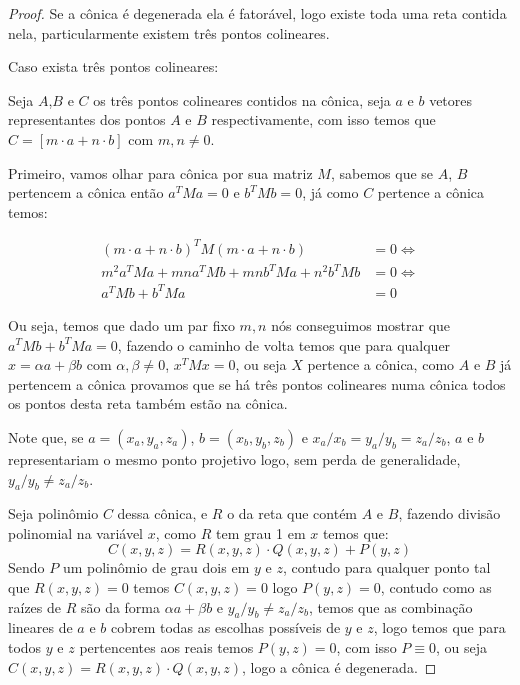 \begin{proof}
Se a cônica é degenerada ela é fatorável, logo existe toda uma reta contida nela, particularmente existem três pontos colineares.

Caso exista três pontos colineares:

Seja $A$,$B$ e $C$ os três pontos colineares contidos na cônica, seja $a$ e $b$ vetores representantes dos pontos $A$ e $B$ respectivamente, com isso temos que $C = [m\cdot a + n \cdot b]$ com $ m,n \ne 0$.

Primeiro, vamos olhar para cônica por sua matriz $M$, sabemos que se $A$, $B$ pertencem a cônica então \(a^T M a = 0 \text{ e } b^T M b = 0\), já como $C$ pertence a cônica temos:

\begin{align}
    (m\cdot a + n \cdot b)^T M (m\cdot a + n \cdot b) &= 0 \iff\\
    m^2 a^T M a + mn a^T M b + mn b^T M a + n^2 b^T M b &= 0 \iff \\
    a^T M b + b^T M a &= 0
\end{align}

Ou seja, temos que dado um par fixo $m,n$ nós conseguimos mostrar que $ a^T M b + b^T M a = 0$, fazendo o caminho de volta temos que para qualquer $x = \alpha a + \beta b$ com $\alpha,\beta \ne 0$, $x^T M x = 0$, ou seja $X$ pertence a cônica, como $A$ e $B$ já pertencem a cônica provamos que se há três pontos colineares numa cônica todos os pontos desta reta também estão na cônica.

Note que, se $a = (x_a,y_a,z_a)$, $b = (x_b,y_b,z_b)$ e $x_a/x_b = y_a/y_b = z_a/z_b$, $a$ e $b$ representariam o mesmo ponto projetivo logo, sem perda de generalidade, $y_a/y_b \ne z_a/z_b$.

Seja polinômio $C$ dessa cônica, e $R$ o da reta que contém $A$ e $B$, fazendo divisão polinomial na variável $x$, como $R$ tem grau 1 em $x$ temos que:
\[C(x,y,z) = R(x,y,z)\cdot Q(x,y,z) + P(y,z) \]
Sendo $P$ um polinômio de grau dois em $y$ e $z$, contudo para qualquer ponto tal que $R(x,y,z) = 0$ temos $C(x,y,z) = 0$ logo $P(y,z) = 0$, contudo como as raízes de $R$ são da forma $\alpha a + \beta b$ e $y_a/y_b \ne z_a/z_b$, temos que as combinação lineares de $a$ e $b$ cobrem todas as escolhas possíveis de $y$ e $z$, logo temos que para todos $y$ e $z$ pertencentes aos reais temos $P(y,z) = 0$, com isso $P \equiv 0$, ou seja $C(x,y,z) = R(x,y,z)\cdot Q(x,y,z)$, logo a cônica é degenerada.
\end{proof}